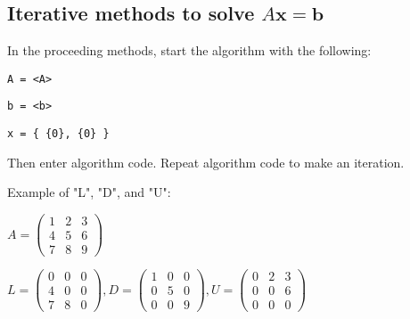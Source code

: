 \documentclass[10pt,letterpaper]{article}
\newenvironment{tight_item}
{\begin{itemize}
\setlength{\parskip}{0pt}
\setlength{\parsep}{0pt}
\setlength{\itemsep}{0pt}
\setlength{\parsep}{0pt}
\setlength{\topsep}{0pt}
\setlength{\partopsep}{0pt}
\setlength{\leftmargin}{0em}
\setlength{\labelwidth}{0em}
\setlength{\labelsep}{1em} }
{\end{itemize}}
\newenvironment{tight_enum}
{\begin{enumerate}
\setlength{\parskip}{0pt}
\setlength{\parsep}{0pt}
\setlength{\itemsep}{0pt}
\setlength{\parsep}{0pt}
\setlength{\topsep}{0pt}
\setlength{\partopsep}{0pt}
\setlength{\leftmargin}{0em}
\setlength{\labelwidth}{0em}
\setlength{\labelsep}{1em} }
{\end{enumerate}}
\begin{document}
\begin{multicols*}{2}

\section{Iterative methods to solve $A\mathbf{x} = \mathbf{b}$}
\begin{tight_item}
\item In the proceeding methods, start the algorithm with the following:
\begin{tight_enum}
\item \texttt{A = <A>}
\item \texttt{b = <b>}
\item \texttt{x = \{ \{0\}, \{0\} \} }
\end{tight_enum}
Then enter algorithm code. Repeat algorithm code to make an iteration.

\item Example of "L", "D", and "U":
\begin{tight_item}
\item $A = \begin{pmatrix}
1 & 2 & 3 \\
4 & 5 & 6 \\
7 & 8 & 9
\end{pmatrix}$
\item $L = \begin{pmatrix}
0 & 0 & 0 \\
4 & 0 & 0 \\
7 & 8 & 0
\end{pmatrix},
D = \begin{pmatrix}
1 & 0 & 0 \\
0 & 5 & 0 \\
0 & 0 & 9
\end{pmatrix},
U = \begin{pmatrix}
0 & 2 & 3 \\
0 & 0 & 6 \\
0 & 0 & 0
\end{pmatrix}$
\end{tight_item}
\end{tight_item}


\end{multicols*}
\end{document}
